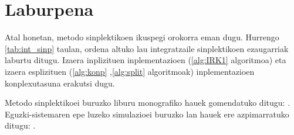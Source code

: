 \section{Laburpena}

Atal honetan, metodo sinplektikoen ikuspegi orokorra eman dugu. Hurrengo \ref{tab:int_sinp} taulan, ordena altuko lau integratzaile sinplektikoen ezaugarriak laburtu ditugu. Izaera inplizituen inplementazioen (\ref{alg:IRK1} algoritmoa) eta izaera esplizituen (\ref{alg:konp} ,\ref{alg:split} algoritmoak) inplementazioen  konplexutasuna erakutsi dugu. 


\begin{table}[h!]
\centering
\caption[Integrazio metodo sinplektikoen laburpena]{Integrazio metodo sinplektikoen laburpena}
\label{tab:int_sinp}       %
\end{table}
 
 
 Metodo sinplektikoei buruzko liburu monografiko hauek gomendatuko ditugu: \cite{JMSanz-Serna1994,Hairer2006,Leimkuhler2004,Feng2010}. Eguzki-sistemaren epe luzeko simulazioei buruzko lan hauek ere azpimarratuko ditugu: \cite{Brumberg2013,Kholshevnikov2007,Morbidelli2002,Ito2007,Kaplan2015}.
